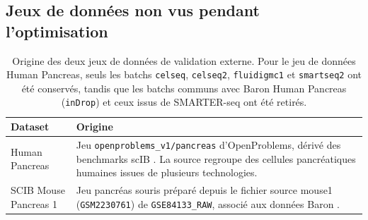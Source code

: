 \subsection*{Jeux de données non vus pendant l'optimisation}

\begin{table}[H]
\centering
\footnotesize
\setlength{\tabcolsep}{2.5pt}
\caption{Caractéristiques des deux jeux de données utilisés pour évaluer scRAW sur des données non vues pendant l'optimisation des hyperparamètres.}
\label{tab:datasets_validation_externe}
\end{table}

\begin{table}[H]
\centering
\footnotesize
\setlength{\tabcolsep}{4pt}
\begin{tabularx}{\textwidth}{p{} X}
\toprule
\textbf{Dataset} & \textbf{Origine} \\
\midrule
Human Pancreas & Jeu \texttt{openproblems\_v1/pancreas} d'OpenProblems, dérivé des benchmarks scIB \cite{luecken_benchmarking_2022}. La source regroupe des cellules pancréatiques humaines issues de plusieurs technologies. \\
SCIB Mouse Pancreas 1 & Jeu pancréas souris préparé depuis le fichier source mouse1 (\texttt{GSM2230761}) de \texttt{GSE84133\_RAW}, associé aux données Baron \cite{Baron2016}. \\
\bottomrule
\end{tabularx}
\caption{Origine des deux jeux de données de validation externe. Pour le jeu de données Human Pancreas, seuls les batchs \texttt{celseq}, \texttt{celseq2}, \texttt{fluidigmc1} et \texttt{smartseq2} ont été conservés, tandis que les batchs communs avec Baron Human Pancreas (\texttt{inDrop}) et ceux issus de SMARTER-seq ont été retirés.}
\label{tab:datasets_validation_externe_provenance}
\end{table}


